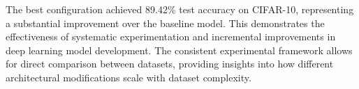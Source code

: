 \documentclass{article}
\begin{document}
The best configuration achieved 89.42\% test accuracy on CIFAR-10, representing a substantial improvement over the baseline model. This demonstrates the effectiveness of systematic experimentation and incremental improvements in deep learning model development. The consistent experimental framework allows for direct comparison between datasets, providing insights into how different architectural modifications scale with dataset complexity.
\end{document}
